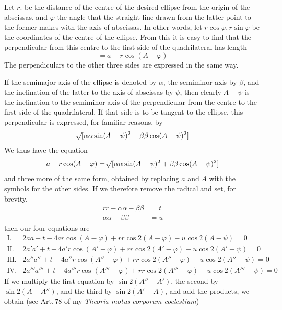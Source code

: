 \par
{}%
Let \(r\). be the distance of the centre of the desired ellipse from the origin of the abscissas, and \(\varphi\) the angle that the straight line drawn from the latter point to the former makes with the axis of abscissas. In other words, let \(r\cos\varphi,r\sin\varphi\) be the coordinates of the centre of the ellipse. From this it is easy to find that the perpendicular from this centre to the first side of the quadrilateral has length
\[
=a-r\cos(A-\varphi)
\]
The perpendiculars to the other three sides are expressed in the same way.

If the semimajor axis of the ellipse is denoted by \(\alpha\), the semiminor axis by \(\beta\), and the inclination of the latter to the axis of abscissas by \(\psi\), then clearly \(A-\psi\) is the inclination to the semiminor axis of the perpendicular from the centre to the first side of the quadrilateral. If that side is to be tangent to the ellipse, this perpendicular is expressed, for familiar reasons, by
\[
\mathord{{}^{}\!\surd}[\alpha\alpha\sin(A-\psi)^2+\beta\beta\cos(A-\psi)^2]
\]
We thus have the equation
\[
a-r\cos(A-\varphi)=\mathord{{}^{}\!\surd}[\alpha\alpha\sin(A-\psi)^2+\beta\beta\cos(A-\psi)^2]
\]
and three more of the same form, obtained by replacing \(a\) and \(A\) with the symbols for the other sides. If we therefore remove the radical and set, for brevity,
\[
\begin{aligned}
rr-\alpha\alpha-\beta\beta&=t\\
\alpha\alpha-\beta\beta&=u
\end{aligned}
\]
then our four equations are
\begingroup\fontsize{10}{12}\selectfont
\[
\begin{array}{rl}
\mathrm{I.}&2aa+t-4ar\cos(A-\varphi)+rr\cos2(A-\varphi)-u\cos2(A-\psi)=0\\
\mathrm{II.}&2a'a'+t-4a'r\cos(A'-\varphi)+rr\cos2(A'-\varphi)-u\cos2(A'-\psi)=0\\
\mathrm{III.}&2a''a''+t-4a''r\cos(A''-\varphi)+rr\cos2(A''-\varphi)-u\cos2(A''-\psi)=0\\
\mathrm{IV.}&2a'''a'''+t-4a'''r\cos(A'''-\varphi)+rr\cos2(A'''-\varphi)-u\cos2(A'''-\psi)=0
\end{array}
\]
\endgroup
If we multiply the first equation by \(\sin2(A''-A')\), the second by \(\sin2(A-A'')\), and the third by \(\sin2(A'-A)\), and add the products, we obtain (see Art.\,78 of my \textit{Theoria motus corporum coelestium})
